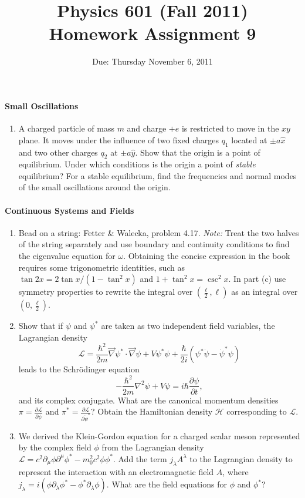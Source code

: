 \documentclass[letterpaper,11pt]{article}
\title{Physics 601 (Fall 2011) \\ Homework Assignment 9}
\date{Due: Thursday November 6, 2011}
\begin{document}
\maketitle

\paragraph*{Small Oscillations}
\begin{enumerate}
 \item A charged particle of mass $m$ and charge $+e$ is restricted to move in the $xy$ plane.  It moves under the influence of two fixed charges $q_1$ located at $\pm a \hat{x}$ and two other charges $q_2$ at $\pm a \hat{y}$.  Show that the origin is a point of equilibrium.  Under which conditions is the origin a point of \emph{stable} equilibrium?  For a stable equilibrium, find the frequencies and normal modes of the small oscillations around the origin.
\end{enumerate}

\paragraph*{Continuous Systems and Fields}
\begin{enumerate}[resume]
 \item Bead on a string: Fetter \& Walecka, problem 4.17. \emph{Note:} Treat the two halves of the string separately and use boundary and continuity conditions to find the eigenvalue equation for $\omega$.  Obtaining the concise expression in the book requires some trigonometric identities, such as $\tan 2x = 2 \tan x / (1-\tan^2 x)$ and $1 + \tan^2 x = \csc^2 x$.  In part (c) use symmetry properties to rewrite the integral over $(\frac{\ell}{2},\ell)$ as an integral over $(0,\frac{\ell}{2})$.
 \item Show that if $\psi$ and $\psi^*$ are taken as two independent field variables, the Lagrangian density
 \begin{equation}
  \mathcal{L} = \frac{\hbar^2}{2m} \vec\nabla\psi^* \cdot \vec\nabla\psi + V \psi^*\psi + \frac{\hbar}{2i}(\psi^*\dot{\psi} - \dot{\psi}^*\psi)
 \end{equation}
 leads to the Schr\"odinger equation
 \begin{equation}
  -\frac{\hbar^2}{2m} \nabla^2 \psi + V \psi = i\hbar \frac{\partial \psi}{\partial t},
 \end{equation}
 and its complex conjugate.  What are the canonical momentum densities $\pi = \frac{\partial \mathcal{L}}{\partial \dot\psi}$ and $\pi^* = \frac{\partial \mathcal{L}}{\partial \dot\psi^*}$?  Obtain the Hamiltonian density $\mathcal{H}$ corresponding to $\mathcal{L}$.
 \item We derived the Klein-Gordon equation for a charged scalar meson represented by the complex field $\phi$ from the Lagrangian density $\mathcal{L} = c^2 \partial_\mu \phi \partial^\mu \phi^* - m_0^2 c^2 \phi \phi^*$.  Add the term $j_\lambda A^\lambda$ to the Lagrangian density to represent the interaction with an electromagnetic field $A$, where $j_\lambda = i(\phi \partial_\lambda \phi^* - \phi^* \partial_\lambda \phi)$.  What are the field equations for $\phi$ and $\phi^*$?
\end{enumerate}
\end{document}
